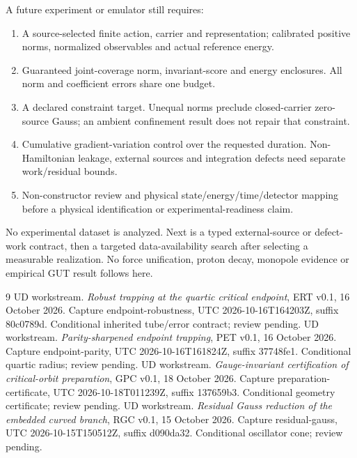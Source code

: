 \documentclass[11pt,a4paper]{article}
\begin{document}
A future experiment or emulator still requires:
\begin{enumerate}
\item A source-selected finite action, carrier and representation; calibrated positive norms, normalized observables and actual reference energy.
\item Guaranteed joint-coverage norm, invariant-score and energy enclosures. All norm and coefficient errors share one budget.
\item A declared constraint target. Unequal norms preclude closed-carrier zero-source Gauss; an ambient confinement result does not repair that constraint.
\item Cumulative gradient-variation control over the requested duration. Non-Hamiltonian leakage, external sources and integration defects need separate work/residual bounds.
\item Non-constructor review and physical state/energy/time/detector mapping before a physical identification or experimental-readiness claim.
\end{enumerate}
No experimental dataset is analyzed. Next is a typed external-source or defect-work contract, then a targeted data-availability search after selecting a measurable realization. No force unification, proton decay, monopole evidence or empirical GUT result follows here.
\begin{thebibliography}{9}\small\setlength{\itemsep}{2pt}
 UD workstream. \emph{Robust trapping at the quartic critical endpoint}, ERT v0.1, 16 October 2026. Capture endpoint-robustness, UTC 2026-10-16T164203Z, suffix 80c0789d. Conditional inherited tube/error contract; review pending.
 UD workstream. \emph{Parity-sharpened endpoint trapping}, PET v0.1, 16 October 2026. Capture endpoint-parity, UTC 2026-10-16T161824Z, suffix 37748fe1. Conditional quartic radius; review pending.
 UD workstream. \emph{Gauge-invariant certification of critical-orbit preparation}, GPC v0.1, 18 October 2026. Capture preparation-certificate, UTC 2026-10-18T011239Z, suffix 137659b3. Conditional geometry certificate; review pending.
 UD workstream. \emph{Residual Gauss reduction of the embedded curved branch}, RGC v0.1, 15 October 2026. Capture residual-gauss, UTC 2026-10-15T150512Z, suffix d090da32. Conditional oscillator cone; review pending.
\end{thebibliography}
\end{document}
